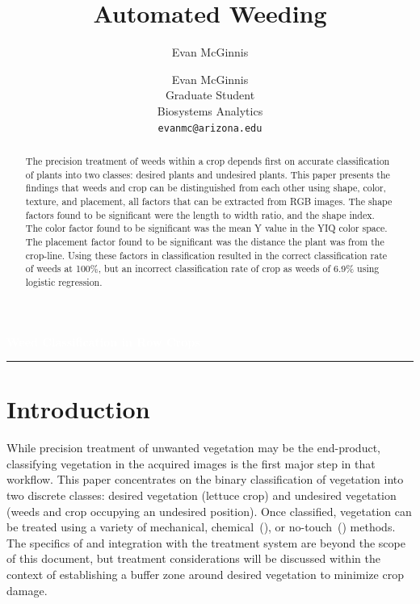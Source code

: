\documentclass[letterpaper]{article}
\author{Evan McGinnis}
\title{Automated Weeding}
\author{%
    Evan McGinnis \\
    Graduate Student \\
    Biosystems Analytics \\
    \texttt{evanmc@arizona.edu}\vspace{40pt} \\
    }
\makeatletter
\def\printauthor{%
    {\large \@author}}
\makeatother
\begin{document}
\begin{titlepage}
\BgThispage
{}
\vspace*{1cm}
\noindent
\textcolor{white}{\Huge\textbf{\textsf{Weed Classification in Row Crops}}}
\vspace*{3.5cm}\par
\noindent
\begin{minipage}{0.35\linewidth}
    \begin{flushright}
        \printauthor
    \end{flushright}
\end{minipage} \hspace{15pt}
%
\begin{minipage}{0.02\linewidth}
    \rule{1pt}{175pt}
\end{minipage} \hspace{-10pt}
%
\begin{minipage}{0.70\linewidth}
\vspace{5pt}
    \begin{abstract} 
The precision treatment of weeds within a crop depends first on accurate classification of plants into two classes: desired plants and undesired plants. This paper presents the findings that weeds and crop can be distinguished from each other using shape, color, texture, and placement, all factors that can be extracted from RGB images. The shape factors found to be significant were the length to width ratio, and the shape index. The color factor found to be significant was the mean Y value in the YIQ color space. The placement factor found to be significant was the distance the plant was from the crop-line. Using these factors in classification resulted in the correct classification rate of weeds at 100\%, but an incorrect classification rate of crop as weeds of 6.9\% using logistic regression.
    \end{abstract}
\end{minipage}
\end{titlepage}
\restoregeometry
%
%
\tableofcontents
\listoffigures
\listoftables
\newpage

%
%



\section{Introduction}
While precision treatment of unwanted vegetation may be the end-product, classifying vegetation in the acquired images is the first major step in that workflow. This paper concentrates on the binary classification of vegetation into two discrete classes: desired vegetation (lettuce crop) and undesired vegetation (weeds and crop occupying an undesired position). Once classified, vegetation can be treated using a variety of mechanical, chemical~(\cite{Saile2022-vu}), or no-touch~(\cite{Saile2022-vu,Mwitta2022-yt}) methods. The specifics of and integration with the treatment system are beyond the scope of this document, but treatment considerations will be discussed within the context of establishing a buffer zone around desired vegetation to minimize crop damage.
\end{document}
